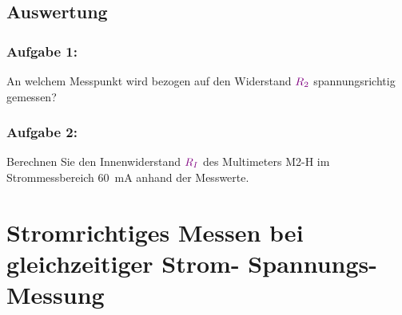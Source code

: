 \documentclass[11pt,a4paper,titlepage,parskip=half]{scrreprt}
\begin{document}
        \subsection{Auswertung}
            \subsubsection{Aufgabe 1:}  An welchem Messpunkt wird bezogen auf den Widerstand $\textcolor{violet}{R_2}$ spannungsrichtig gemessen?
            
     
            
            
            \subsubsection{Aufgabe 2:} Berechnen Sie den Innenwiderstand $\textcolor{violet}{R_I}$ des Multimeters M2-H im Strommessbereich \SI{60}{\milli\ampere} anhand der Messwerte.
            
            
    
        \section{Stromrichtiges Messen bei gleichzeitiger Strom- Spannungs- Messung}
       
\end{document}
